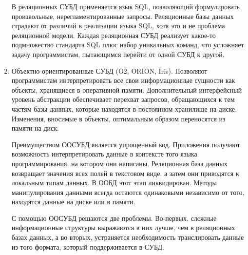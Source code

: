 \documentclass[12pt,a4paper,oneside]{article} %
\begin{document}
\begin{enumerate}
В реляционных СУБД применяется язык SQL, позволяющий \linebreak
формулировать произвольные, нерегламентированные запросы. \linebreak
Реляционные базы данных страдают от различий в реализации \linebreak
языка SQL, хотя это и не проблема реляционной модели. Каждая \linebreak
реляционная СУБД реализует какое-то подмножество стандарта \linebreak
SQL плюс набор уникальных команд, что усложняет задачу \linebreak
программистам, пытающимся перейти от одной СУБД к другой.

\item Объектно-ориентированные СУБД (O2, ORION, Iris). Позволяют \linebreak
программистам интерпретировать все свои информационные сущности \linebreak
как объекты, хранящиеся в оперативной памяти. Дополнительный \linebreak
интерфейсный уровень абстракции обеспечивает перехват запросов, \linebreak
обращающихся к тем частям базы данных, которые находятся в \linebreak
постоянном хранилище на диске. Изменения, вносимые в объекты, \linebreak
оптимальным образом переносятся из памяти на диск.

Преимуществом ООСУБД является упрощенный код. Приложения \linebreak
получают возможность интерпретировать данные в контексте того \linebreak
языка программирования, на котором они написаны. Реляционная \linebreak
база данных возвращает значения всех полей в текстовом виде, а \linebreak
затем они приводятся к локальным типам данных. В ООБД этот этап \linebreak
ликвидирован. Методы манипулирования данными всегда остаются \linebreak
одинаковыми независимо от того, находятся данные на диске или \linebreak
в памяти.

С помощью ООСУБД решаются две проблемы. Во-первых, сложные \linebreak
информационные структуры выражаются в них лучше, чем в \linebreak
реляционных базах данных, а во вторых, устраняется \linebreak
необходимость транслировать данные из того формата, \linebreak
который поддерживается в СУБД.


\end{enumerate}
\end{document}
